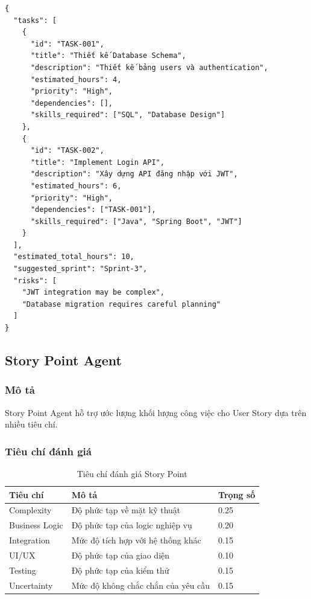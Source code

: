 \documentclass[12pt,a4paper]{report}
\begin{document}
\begin{verbatim}
{
  "tasks": [
    {
      "id": "TASK-001",
      "title": "Thiết kế Database Schema",
      "description": "Thiết kế bảng users và authentication",
      "estimated_hours": 4,
      "priority": "High",
      "dependencies": [],
      "skills_required": ["SQL", "Database Design"]
    },
    {
      "id": "TASK-002",
      "title": "Implement Login API",
      "description": "Xây dựng API đăng nhập với JWT",
      "estimated_hours": 6,
      "priority": "High",
      "dependencies": ["TASK-001"],
      "skills_required": ["Java", "Spring Boot", "JWT"]
    }
  ],
  "estimated_total_hours": 10,
  "suggested_sprint": "Sprint-3",
  "risks": [
    "JWT integration may be complex",
    "Database migration requires careful planning"
  ]
}
\end{verbatim}

\subsection{Story Point Agent}

\subsubsection{Mô tả}

Story Point Agent hỗ trợ ước lượng khối lượng công việc cho User Story dựa trên nhiều tiêu chí.

\subsubsection{Tiêu chí đánh giá}

\begin{table}[H]
\centering
\caption{Tiêu chí đánh giá Story Point}
\begin{tabular}{|p{4cm}|p{5cm}|p{5cm}|}
\hline
\textbf{Tiêu chí} & \textbf{Mô tả} & \textbf{Trọng số} \\
\hline
Complexity & Độ phức tạp về mặt kỹ thuật & 0.25 \\
\hline
Business Logic & Độ phức tạp của logic nghiệp vụ & 0.20 \\
\hline
Integration & Mức độ tích hợp với hệ thống khác & 0.15 \\
\hline
UI/UX & Độ phức tạp của giao diện & 0.10 \\
\hline
Testing & Độ phức tạp của kiểm thử & 0.15 \\
\hline
Uncertainty & Mức độ không chắc chắn của yêu cầu & 0.15 \\
\hline
\end{tabular}
\label{tab:story_point_criteria}
\end{table}
\end{document}
